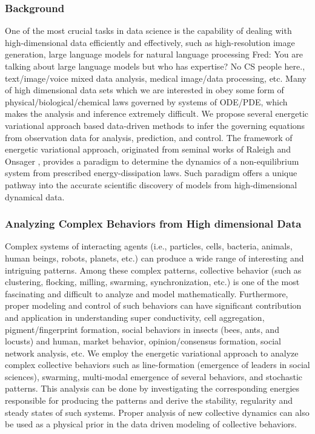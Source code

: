 \documentclass[11pt]{NSFamsart}
\newcommand{\FredNote}[1]{{\color{blue} Fred: #1}}
\begin{document}
\subsubsection*{Background} One of the most crucial tasks in data science is the capability of dealing with high-dimensional data efficiently and effectively, such as high-resolution image generation, large language models for natural language processing \FredNote{You are talking about large language models but who has expertise?  No CS people here.}, text/image/voice mixed data analysis, medical image/data processing, etc.  Many of high dimensional data sets which we are interested in obey some form of physical/biological/chemical laws governed by systems of ODE/PDE, which makes the analysis and inference extremely difficult.  We propose several energetic variational approach based data-driven methods to infer the governing equations from observation data for analysis, prediction, and control.  The framework of energetic variational approach, originated from seminal works of Raleigh \cite{strutt1871some} and Onsager \cite{onsager1931reciprocal,onsager1931reciprocal2}, provides a paradigm to determine the dynamics of a non-equilibrium system from prescribed energy-dissipation laws.  Such paradigm offers a unique pathway into the accurate scientific discovery of models from high-dimensional dynamical data. 

\subsubsection*{Analyzing Complex Behaviors from High dimensional Data}
Complex systems of interacting agents (i.e., particles, cells, bacteria, animals, human beings, robots, planets, etc.) %
can produce a wide range of interesting and intriguing patterns.  Among these complex patterns, collective behavior (such as clustering, flocking, milling, swarming, synchronization, etc.) is one of the most fascinating and difficult to analyze and model mathematically.  Furthermore, proper modeling and control of such behaviors can have significant contribution and application in understanding super conductivity, cell aggregation, pigment/fingerprint formation, social behaviors in insects (bees, ants, and locusts) and human, market behavior, opinion/consensus formation, social network analysis, etc. We employ the energetic variational approach to analyze complex collective behaviors such as line-formation (emergence of leaders in social sciences), swarming, multi-modal emergence of several behaviors, and stochastic patterns.  This analysis can be done by investigating the corresponding energies responsible for producing the patterns and derive the stability, regularity and steady states of such systems.  Proper analysis of new collective dynamics can also be used as a physical prior in the data driven modeling of collective behaviors.
\end{document}
